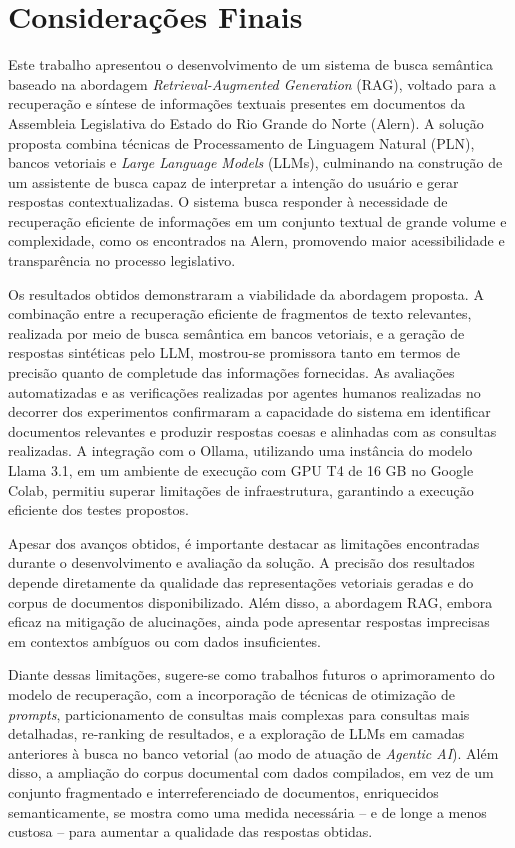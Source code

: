 \chapter{Considerações Finais}
\label{cap:Consideracoes}

Este trabalho apresentou o desenvolvimento de um sistema de busca semântica baseado na abordagem \textit{Retrieval-Augmented Generation} (RAG), voltado para a recuperação e síntese de informações textuais presentes em documentos da Assembleia Legislativa do Estado do Rio Grande do Norte (\ac{Alern}). A solução proposta combina técnicas de Processamento de Linguagem Natural (PLN), bancos vetoriais e \textit{Large Language Models} (LLMs), culminando na construção de um assistente de busca capaz de interpretar a intenção do usuário e gerar respostas contextualizadas. O sistema busca responder à necessidade de recuperação eficiente de informações em um conjunto textual de grande volume e complexidade, como os encontrados na \ac{Alern}, promovendo maior acessibilidade e transparência no processo legislativo.

Os resultados obtidos demonstraram a viabilidade da abordagem proposta. A combinação entre a recuperação eficiente de fragmentos de texto relevantes, realizada por meio de busca semântica em bancos vetoriais, e a geração de respostas sintéticas pelo \ac{LLM}, mostrou-se promissora tanto em termos de precisão quanto de completude das informações fornecidas. As avaliações automatizadas e as verificações realizadas por agentes humanos realizadas no decorrer dos experimentos confirmaram a capacidade do sistema em identificar documentos relevantes e produzir respostas coesas e alinhadas com as consultas realizadas. A integração com o Ollama, utilizando uma instância do modelo Llama 3.1, em um ambiente de execução com GPU T4 de 16 GB no Google Colab, permitiu superar limitações de infraestrutura, garantindo a execução eficiente dos testes propostos.

Apesar dos avanços obtidos, é importante destacar as limitações encontradas durante o desenvolvimento e avaliação da solução. A precisão dos resultados depende diretamente da qualidade das representações vetoriais geradas e do corpus de documentos disponibilizado. Além disso, a abordagem \ac{RAG}, embora eficaz na mitigação de alucinações, ainda pode apresentar respostas imprecisas em contextos ambíguos ou com dados insuficientes.

Diante dessas limitações, sugere-se como trabalhos futuros o aprimoramento do modelo de recuperação, com a incorporação de técnicas de otimização de \textit{prompts}, particionamento de consultas mais complexas para consultas mais detalhadas, re-ranking de resultados, e a exploração de \ac{LLM}s em camadas anteriores à busca no banco vetorial (ao modo de atuação de \textit{Agentic AI}). Além disso, a ampliação do corpus documental com dados compilados, em vez de um conjunto fragmentado e interreferenciado de documentos, enriquecidos semanticamente, se mostra como uma medida necessária -- e de longe a menos custosa -- para aumentar a qualidade das respostas obtidas.

